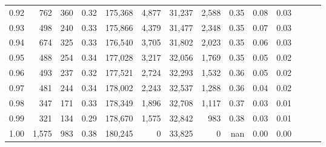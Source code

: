 \begin{tabular}{rrrrrrrrrrrrrr}
0.92 &    762 &  360 &  0.32 &  175,368 &    4,877 &  31,237 &   2,588 &  0.35 &  0.08 &      0.03 \\
0.93 &    498 &  240 &  0.33 &  175,866 &    4,379 &  31,477 &   2,348 &  0.35 &  0.07 &      0.03 \\
0.94 &    674 &  325 &  0.33 &  176,540 &    3,705 &  31,802 &   2,023 &  0.35 &  0.06 &      0.03 \\
0.95 &    488 &  254 &  0.34 &  177,028 &    3,217 &  32,056 &   1,769 &  0.35 &  0.05 &      0.02 \\
0.96 &    493 &  237 &  0.32 &  177,521 &    2,724 &  32,293 &   1,532 &  0.36 &  0.05 &      0.02 \\
0.97 &    481 &  244 &  0.34 &  178,002 &    2,243 &  32,537 &   1,288 &  0.36 &  0.04 &      0.02 \\
0.98 &    347 &  171 &  0.33 &  178,349 &    1,896 &  32,708 &   1,117 &  0.37 &  0.03 &      0.01 \\
0.99 &    321 &  134 &  0.29 &  178,670 &    1,575 &  32,842 &     983 &  0.38 &  0.03 &      0.01 \\
1.00 &  1,575 &  983 &  0.38 &  180,245 &        0 &  33,825 &       0 &   nan &  0.00 &      0.00 \\
\bottomrule
\end{tabular}
